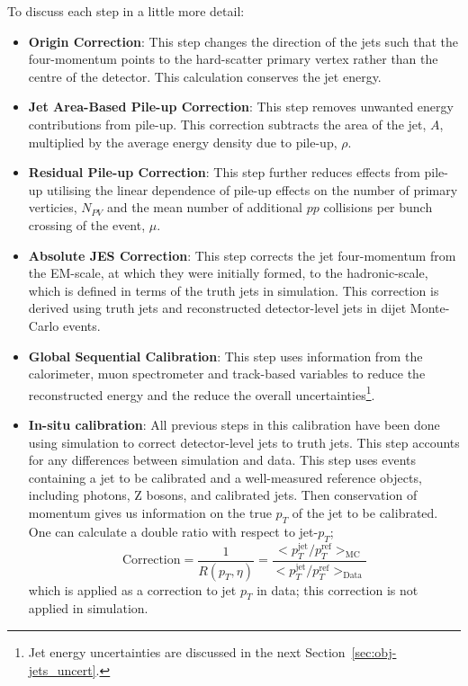 \noindent
To discuss each step in a little more detail:
\begin{itemize}[leftmargin=*]
\item\textbf{Origin Correction}:
  This step changes the direction of the jets such that the four-momentum points to the hard-scatter primary vertex
  rather than the centre of the detector.
  This calculation conserves the jet energy.\vspace{0.5em}
\item\textbf{Jet Area-Based Pile-up Correction}:
  This step removes unwanted energy contributions from pile-up.
  This correction subtracts the area of the jet, $A$, multiplied by the average energy density due to pile-up, $\rho$.\vspace{0.5em}
\item\textbf{Residual Pile-up Correction}:
  This step further reduces effects from pile-up utilising the linear dependence of pile-up effects on
  the number of primary verticies, $N_{PV}$
  and the mean number of additional $pp$ collisions per bunch crossing of the event, $\mu$.\vspace{0.5em}
\item\textbf{Absolute JES Correction}:
  This step corrects the jet four-momentum from the EM-scale, at which they were initially formed,
  to the hadronic-scale, which is defined in terms of the truth jets in simulation.
  This correction is derived using truth jets and reconstructed detector-level jets in dijet Monte-Carlo events.\vspace{0.5em}
\item\textbf{Global Sequential Calibration}:
  This step uses information from the calorimeter, muon spectrometer and track-based variables
  to reduce the reconstructed energy and the reduce the overall uncertainties\footnote{Jet energy uncertainties are discussed in the next Section~\ref{sec:obj-jets_uncert}.}.\vspace{0.5em}
\item\textbf{In-situ calibration}:
  All previous steps in this calibration have been done using simulation to correct
  detector-level jets to truth jets. This step accounts for any differences between simulation and data.
  This step uses events containing a jet to be calibrated and a well-measured reference objects, including photons, Z bosons, and calibrated jets.
  Then conservation of momentum gives us information on the true $p_T$ of the jet to be calibrated.
  One can calculate a double ratio with respect to jet-$p_T$;
  \begin{equation}
    \text{Correction} = \frac{1}{R(p_T, \eta)} = \frac{ < p_T^{\text{jet}}/p_T^{\text{ref}}>_{\text{MC}} }{ < p_T^{\text{jet}}/p_T^{\text{ref}}>_{\text{Data}} }
  \end{equation}
  which is applied as a correction to jet $p_T$ in data; this correction is not applied in simulation.
\end{itemize}

